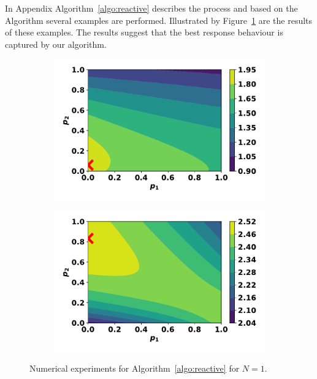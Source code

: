 \documentclass[10pt]{article}
\begin{document}
In Appendix Algorithm~\ref{algo:reactive} describes the process and based on the
Algorithm several examples are performed. Illustrated by Figure~\ref{fig:reactive_pairwise_results}
are the results of these examples. The results suggest that the best response behaviour
is captured by our algorithm.

\begin{figure}
    \centering
    \begin{subfigure}{0.45\textwidth}
        \centering
        \includegraphics[width=.95\textwidth]{img/reactive_pairwise_one.pdf}
    \end{subfigure}
    \begin{subfigure}{0.45\textwidth}
        \centering
        \includegraphics[width=.95\textwidth]{img/reactive_pairwise_two.pdf}
    \end{subfigure}
    \caption{Numerical experiments for Algorithm~\ref{algo:reactive} for \(N=1\).}
    \label{fig:reactive_pairwise_results}
\end{figure}
\end{document}
